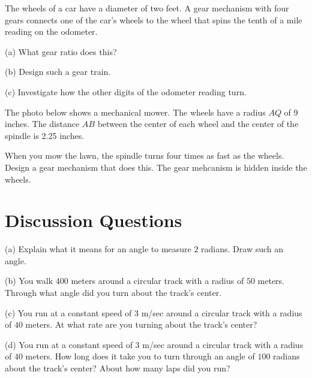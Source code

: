 \documentclass{ximera}
\begin{document}
\begin{question}  \label{Q323342:Angles}
The wheels of a car have a diameter of two feet. A gear mechanism with four gears connects one of the car's wheels to the wheel that spins the tenth of a mile reading on the odometer.

(a) What gear ratio does this?

(b) Design such a gear train.

(c) Investigate how the other digits of the odometer reading turn.
\end{question}


\begin{question}    \label{Q850:Angles}
The photo below shows a mechanical mower. The wheels have a radius $AQ$ of 9 inches. The distance $AB$ between the center of each wheel and the center of the spindle is 2.25 inches. 

When you mow the lawn, the spindle turns four times as fast as the wheels. Design a gear mechanism that does this. The gear mehcanism is hidden inside the wheels.




 
\begin{onlineOnly}
    \begin{center}
\end{center}
\end{onlineOnly}
\end{question}




\section{Discussion Questions}
\begin{question}  \label{Q2873:Angles}
(a) Explain what it means for an angle to measure $2$ radians. Draw such an angle.

(b) You walk $400$ meters around a circular track with a radius of $50$ meters. Through what angle did you turn about the track's center.

(c) You run at a constant speed of $3$ m/sec around a circular track with a radius of $40$ meters. At what rate are you turning about the track's center?

(d) You run at a constant speed of $3$ m/sec around a circular track with a radius of $40$ meters. How long does it take you to turn through an angle of $100$ radians about the track's center? About how many laps did you run?


\end{question}
\end{document}
